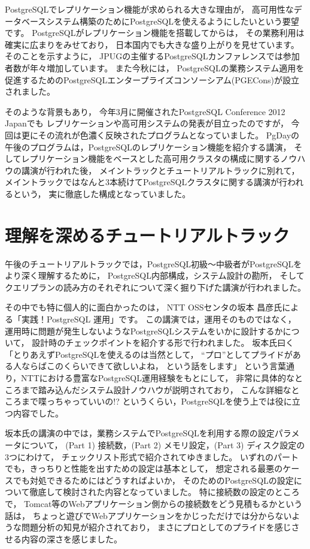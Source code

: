 PostgreSQLでレプリケーション機能が求められる大きな理由が，
高可用性なデータベースシステム構築のためにPostgreSQLを使えるようにしたいという要望です。
PostgreSQLがレプリケーション機能を搭載してからは，
その業務利用は確実に広まりをみせており，
日本国内でも大きな盛り上がりを見せています。
そのことを示すように，
JPUGの主催するPostgreSQLカンファレンスでは参加者数が年々増加しています。
また今秋には，
PostgreSQLの業務システム適用を促進するためのPostgreSQLエンタープライズコンソーシアム(PGECons)が設立されました。

そのような背景もあり，
今年3月に開催されたPostgreSQL Conference 2012 Japanでも
レプリケーションや高可用システムの発表が目立ったのですが，
今回は更にその流れが色濃く反映されたプログラムとなっていました。
PgDayの午後のプログラムは，PostgreSQLのレプリケーション機能を紹介する講演，
そしてレプリケーション機能をベースとした高可用クラスタの構成に関するノウハウの講演が行われた後，
メイントラックとチュートリアルトラックに別れて，
メイントラックではなんと3本続けてPostgreSQLクラスタに関する講演が行われるという，
実に徹底した構成となっていました。

\section{理解を深めるチュートリアルトラック}

午後のチュートリアルトラックでは，PostgreSQL初級〜中級者がPostgreSQLをより深く理解するために，
PostgreSQL内部構成，システム設計の勘所，
そしてクエリプランの読み方のそれぞれについて深く掘り下げた講演が行われました。

その中でも特に個人的に面白かったのは，
NTT OSSセンタの坂本 昌彦氏による「実践！PostgreSQL 運用」です。
この講演では，運用そのものではなく，
運用時に問題が発生しないようなPostgreSQLシステムをいかに設計するかについて，
設計時のチェックポイントを紹介する形で行われました。
坂本氏曰く「とりあえずPostgreSQLを使えるのは当然として，
``プロ''としてプライドがある人ならばこのくらいできて欲しいよね，
という話をします」
という言葉通り，NTTにおける豊富なPostgreSQL運用経験をもとにして，
非常に具体的なところまで踏み込んだシステム設計ノウハウが説明されており，
こんな詳細なところまで喋っちゃっていいの!?
というくらい，PostgreSQLを使う上では役に立つ内容でした。

坂本氏の講演の中では，業務システムでPostgreSQLを利用する際の設定パラメータについて，
(Part 1) 接続数，(Part 2) メモリ設定，(Part 3) ディスク設定の3つにわけて，
チェックリスト形式で紹介されてゆきました。
いずれのパートでも，きっちりと性能を出すための設定は基本として，
想定される最悪のケースでも対処できるためにはどうすればよいか，
そのためのPostgreSQLの設定について徹底して検討された内容となっていました。
特に接続数の設定のところで，
Tomcat等のWebアプリケーション側からの接続数をどう見積もるかという話は，
ちょっと遊びでWebアプリケーションをかじっただけでは分からないような問題分析の知見が紹介されており，
まさにプロとしてのプライドを感じさせる内容の深さを感じました。

